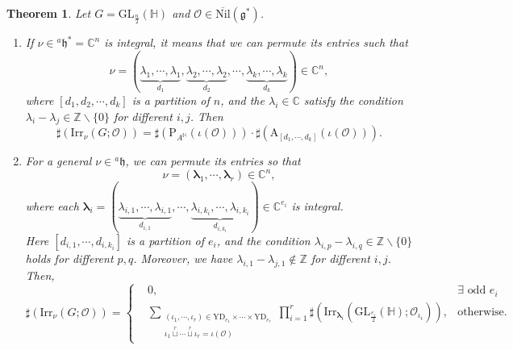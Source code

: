 \documentclass[12pt, a4paper]{amsart}
\numberwithin{equation}{section}
\newtheorem{thm}{Theorem}[section]
\newcommand{\blam}{{\boldsymbol{\lambda}}}
\newcommand{\BC}{{\mathbb {C}}}
\newcommand{\BH}{{\mathbb {H}}}
\newcommand{\BZ}{{\mathbb {Z}}}
\newcommand{\CO}{{\mathcal {O}}}
\newcommand{\fg}{\mathfrak{g}}
\newcommand{\fh}{\mathfrak{h}}
\newcommand{\GL}{{\mathrm{GL}}}
\newcommand{\A}{{\mathrm{A}}}
\newcommand{\Irr}{{\mathrm{Irr}}}
\newcommand{\Nil}{{\mathrm{Nil}}}
\renewcommand{\bar}{\overline}
\begin{document}
\begin{thm}\label{H}
    Let $G= \GL_{\frac{n}{2}}(\BH)$ and $\CO \in \bar{\Nil}(\fg^*)$.
    \begin{enumerate}
        \item If $\nu \in {^a\fh^*} = \BC^n$ is integral, it means that we can permute its entries such that 
        \[
        \nu =  (\underbrace{\lambda_1, \cdots, \lambda_1}_{d_1}, \underbrace{\lambda_2, \cdots, \lambda_2}_{d_2}, \cdots, \underbrace{\lambda_k, \cdots, \lambda_k}_{d_k} ) \in \BC^n,
        \]
        where $[d_1, d_2, \cdots, d_k]$ is a partition of $n$, and the $\lambda_i \in \BC$ satisfy the condition $\lambda_i - \lambda_j \in \BZ \backslash \{0\}$ for different $i,j$. Then
        \begin{equation}
            \sharp(\Irr_{\nu}(G;\CO)) = \sharp(\mathrm{P}_{A^{\BH}}(\iota(\CO)))\cdot \sharp(\A_{[d_1,\cdots,d_k]}(\iota(\CO))).
        \end{equation}
        \item For a general $\nu \in {^{a}\fh}$, we can permute its entries so that
        \[    
        \nu = (\blam_1, \cdots, \blam_r) \in \BC^n,
        \]
        where each $\blam_i = (\underbrace{\lambda_{i,1}, \cdots, \lambda_{i,1}}_{d_{i,1}},\cdots,\underbrace{\lambda_{i,k_i},\cdots,\lambda_{i,k_i}}_{d_{i,k_i}}) \in \BC^{e_i}$ is integral.\\ 
        Here $[d_{i,1}, \cdots, d_{i,k_i}]$ is a partition of $e_i$, and the condition $\lambda_{i,p} - \lambda_{i,q} \in \BZ \backslash \{0\}$ holds for different $p,q$. Moreover, we have $\lambda_{i,1} - \lambda_{j,1} \notin \BZ$ for different $i,j$. Then,
        \begin{equation}
            \sharp(\Irr_{\nu}(G;\CO)) = \left\{
            \begin{aligned}
                &0 , & \textrm{$\exists$ odd $e_i$}\\
                &\sum_{\substack{(\iota_1,\cdots,\iota_r) \in \mathrm{YD}_{e_1} \times \cdots \times \mathrm{YD}_{e_r} \\ \iota_1 \mathop{\sqcup}\limits^r \cdots  \mathop{\sqcup}\limits^r \iota_r = \iota(\CO)}} \prod_{i=1}^r \sharp(\Irr_{\blam_i}(\GL_{\frac{e_i}{2}}(\BH);\CO_{\iota_i})), & \textrm{otherwise}.
            \end{aligned}
            \right.
        \end{equation}
    \end{enumerate}
\end{thm}
\end{document}
